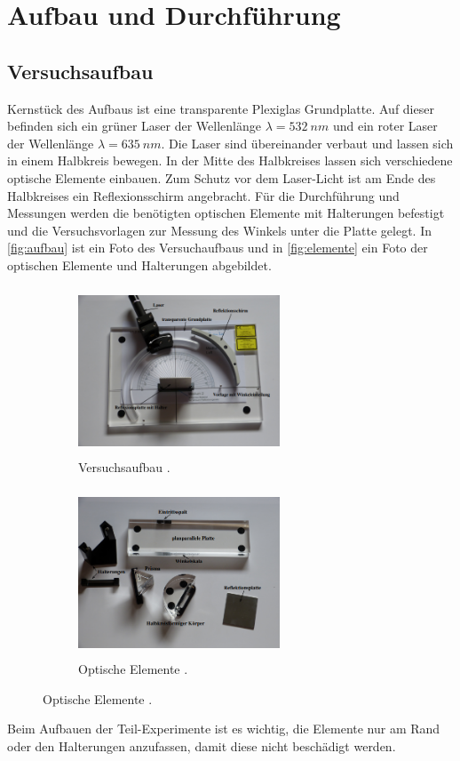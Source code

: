 \section{Aufbau und Durchführung}
\label{sec:Durchführung}
\subsection{Versuchsaufbau}
Kernstück des Aufbaus ist eine transparente Plexiglas Grundplatte. Auf dieser befinden sich ein grüner Laser der Wellenlänge $\lambda = \SI{532}{nm}$ und ein roter Laser
der Wellenlänge $\lambda = \SI{635}{nm}$. Die Laser sind übereinander verbaut und lassen sich in einem Halbkreis bewegen. In der Mitte des Halbkreises lassen sich verschiedene
optische Elemente einbauen. Zum Schutz vor dem Laser-Licht ist am Ende des Halbkreises ein Reflexionsschirm angebracht. Für die Durchführung und Messungen werden die benötigten
optischen Elemente mit Halterungen befestigt und die Versuchsvorlagen zur Messung des Winkels unter die Platte gelegt. In \autoref{fig:aufbau} ist ein Foto des Versuchaufbaus
und in \autoref{fig:elemente} ein Foto der optischen Elemente und Halterungen abgebildet.
\begin{figure}[H]
    \centering
    \begin{subfigure}[b]{0.49\textwidth}
        \centering
        \includegraphics[width=6cm, height=5cm]{img/durchfuehrung1.png}
        \caption[]
        {{\small Versuchsaufbau \cite{V400}.}}    
        \label{fig:aufbau}
    \end{subfigure}
    \hfill
    \begin{subfigure}[b]{0.49\textwidth}  
        \centering 
        \includegraphics[width=6cm, height=5cm]{img/durchfuehrung2.png}
        \caption[]
        {{\small Optische Elemente \cite{V400}.}}    
        \label{fig:elemente}
    \end{subfigure}
\end{figure}
Beim Aufbauen der Teil-Experimente ist es wichtig, die Elemente nur am Rand oder den Halterungen anzufassen, damit diese nicht beschädigt werden.
